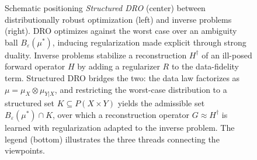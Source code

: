 \documentclass{article}
\theoremstyle{definition}
\theoremstyle{remarksty}
\begin{document}
\begin{figure}[tp]
{%
  }
  \caption{Schematic positioning \emph{Structured DRO} (center) between distributionally robust optimization (left) and inverse problems (right). DRO optimizes against the worst case over an ambiguity ball $B_\varepsilon(\mu^*)$, inducing regularization made explicit through strong duality. Inverse problems stabilize a reconstruction $H^\dagger$ of an ill-posed forward operator $H$ by adding a regularizer $R$ to the data-fidelity term. Structured DRO bridges the two: the data law factorizes as $\mu=\mu_X\otimes\mu_{Y|X}$, and restricting the worst-case distribution to a structured set $K\subseteq P(X\times Y)$ yields the admissible set $B_\varepsilon(\mu^*)\cap K$, over which a reconstruction operator $G\approx H^\dagger$ is learned with regularization adapted to the inverse problem. The legend (bottom) illustrates the three threads connecting the viewpoints.} 
  \label{fig:overview}
\end{figure}
\end{document}
